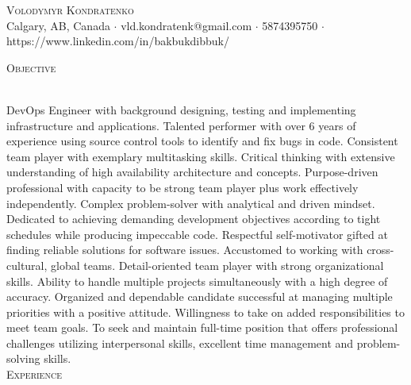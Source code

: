 \documentclass[a4paper]{article}
\newcommand{\lineunder} {
    \vspace*{-8pt} \\
    \hspace*{-18pt} \hrulefill \\
}
\newcommand{\header} [1] {
    {\hspace*{-18pt}\vspace*{6pt} \textsc{#1}}
    \vspace*{-6pt} \lineunder
}
\begin{document}
\vspace*{-40pt}

    

\vspace*{-10pt}
\begin{center}
	{\Huge \scshape {Volodymyr Kondratenko}}\\
	Calgary, AB, Canada $\cdot$ vld.kondratenk@gmail.com $\cdot$ 5874395750 $\cdot$ https://www.linkedin.com/in/bakbukdibbuk/\\
\end{center}





\header{Objective}
\vspace{1mm}

DevOps Engineer with background designing, testing and implementing infrastructure and applications. Talented performer with over 6 years of experience using source control tools to identify and fix bugs in code. Consistent team player with exemplary multitasking skills. Critical thinking with extensive understanding of high availability architecture and concepts. Purpose-driven professional with capacity to be strong team player plus work effectively independently. Complex problem-solver with analytical and driven mindset. Dedicated to achieving demanding development objectives according to tight schedules while producing impeccable code. Respectful self-motivator gifted at finding reliable solutions for software issues. Accustomed to working with cross-cultural, global teams. Detail-oriented team player with strong organizational skills. Ability to handle multiple projects simultaneously with a high degree of accuracy. Organized and dependable candidate successful at managing multiple priorities with a positive attitude. Willingness to take on added responsibilities to meet team goals. To seek and maintain full-time position that offers professional challenges utilizing interpersonal skills, excellent time management and problem-solving skills.\\ 


\header{Experience}
\vspace{1mm}
\end{document}
